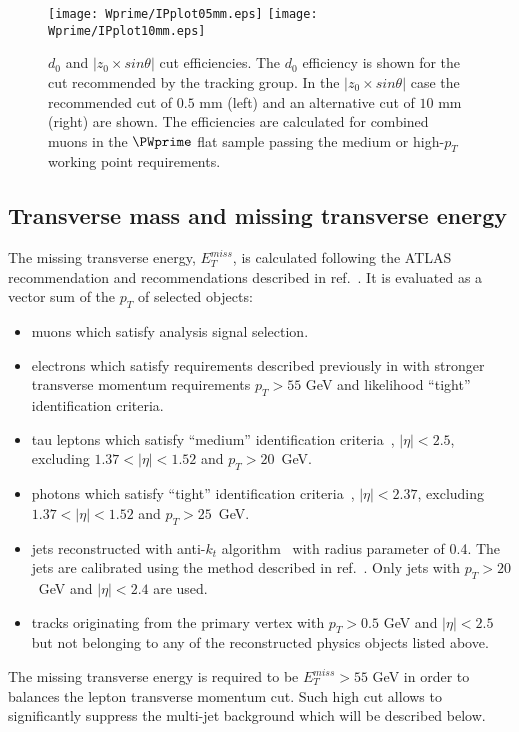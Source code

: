 \begin{figure}[]
  \centering
  \texttt{[image: Wprime/IPplot05mm.eps]}
  \texttt{[image: Wprime/IPplot10mm.eps]}
  \caption{$d_{0}$ and $|z_0 \times sin \theta|$ cut efficiencies. The $d_{0}$ efficiency is shown for the cut recommended by the tracking group. In the $|z_0 \times sin \theta|$ case the recommended cut of $0.5$ mm (left) and an alternative cut of $10$ mm (right) are shown. The efficiencies are calculated for combined muons in the
$\PWprime$ flat sample passing the medium or high-$p_T$ working point requirements.}
  \label{fig:Muon_LepVtxEff}
\end{figure}


\subsection{Transverse mass and missing transverse energy}
\label{subsec:etmiss}
The missing transverse energy, $E_T^{miss}$, is calculated following the ATLAS recommendation and recommendations described in ref.~\cite{met2015_1,met2015_2}.
It is evaluated as a vector sum of the $p_T$ of selected objects:
\begin{itemize}
 \item muons which satisfy analysis signal selection.
 \item electrons which satisfy requirements described previously in
  with stronger transverse momentum requirements $p_T > 55$ GeV
 and likelihood ``tight'' identification criteria.
 \item tau leptons which satisfy ``medium'' identification criteria~\cite{tau_id_8TeV}, $|\eta| < 2.5$, excluding  $1.37 < |\eta| < 1.52$ and $p_T > 20$~GeV.
 \item photons which satisfy ``tight'' identification criteria~\cite{photon_id_2011}, $|\eta| < 2.37$, excluding  $1.37 < |\eta| < 1.52$ and $p_T > 25$~GeV.
 \item jets reconstructed with anti-$k_t$ algorithm~\cite{jet_anti_kt} with radius parameter of 0.4.
 The jets are calibrated using the method described in ref.~\cite{jet_calib_syst_13TeV}.
 Only jets with $p_T > 20$~GeV and $|\eta| < 2.4$ are used. 
 \item tracks originating from the primary vertex with $p_T > 0.5$ GeV and $|\eta| < 2.5$ but not belonging to any of the reconstructed physics objects listed above.
\end{itemize}
The missing transverse energy is required to be $E_T^{miss} > 55$ GeV in order 
to balances the lepton transverse momentum cut.
Such high cut allows to significantly suppress 
the multi-jet background which will be described below.


